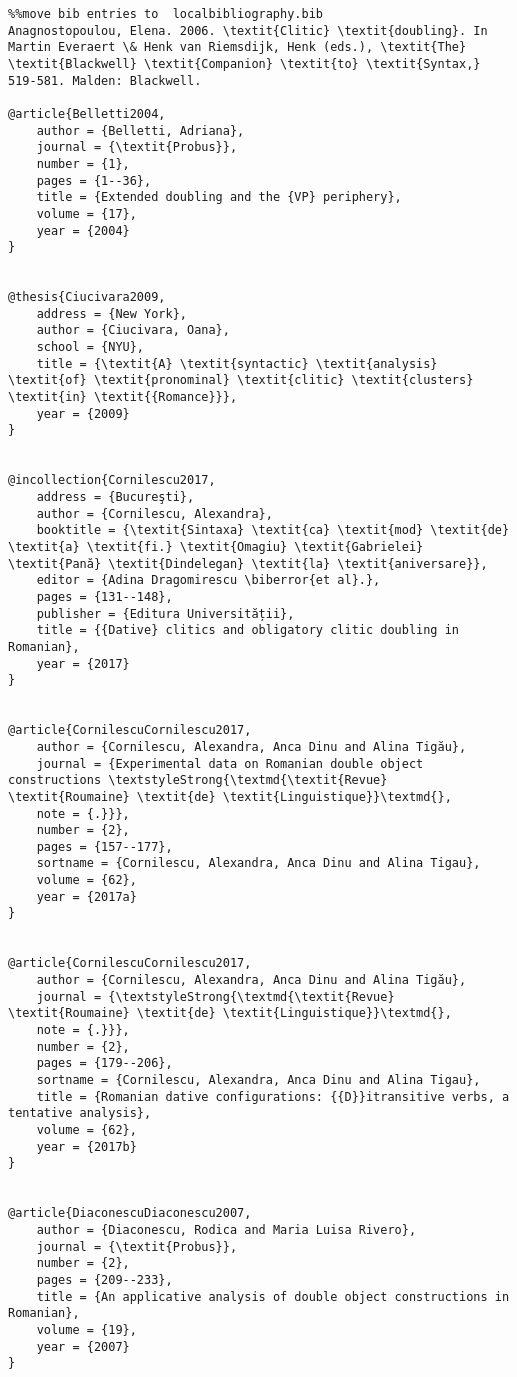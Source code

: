 \documentclass[output=paper,modfonts,nonflat]{langsci/langscibook}
\begin{document}
\begin{verbatim}%%move bib entries to  localbibliography.bib
Anagnostopoulou, Elena. 2006. \textit{Clitic} \textit{doubling}. In Martin Everaert \& Henk van Riemsdijk, Henk (eds.), \textit{The} \textit{Blackwell} \textit{Companion} \textit{to} \textit{Syntax,} 519-581. Malden: Blackwell.

@article{Belletti2004,
	author = {Belletti, Adriana},
	journal = {\textit{Probus}},
	number = {1},
	pages = {1--36},
	title = {Extended doubling and the {VP} periphery},
	volume = {17},
	year = {2004}
}


@thesis{Ciucivara2009,
	address = {New York},
	author = {Ciucivara, Oana},
	school = {NYU},
	title = {\textit{A} \textit{syntactic} \textit{analysis} \textit{of} \textit{pronominal} \textit{clitic} \textit{clusters} \textit{in} \textit{{Romance}}},
	year = {2009}
}


@incollection{Cornilescu2017,
	address = {Bucureşti},
	author = {Cornilescu, Alexandra},
	booktitle = {\textit{Sintaxa} \textit{ca} \textit{mod} \textit{de} \textit{a} \textit{fi.} \textit{Omagiu} \textit{Gabrielei} \textit{Pană} \textit{Dindelegan} \textit{la} \textit{aniversare}},
	editor = {Adina Dragomirescu \biberror{et al}.},
	pages = {131--148},
	publisher = {Editura Universității},
	title = {{Dative} clitics and obligatory clitic doubling in Romanian},
	year = {2017}
}


@article{CornilescuCornilescu2017,
	author = {Cornilescu, Alexandra, Anca Dinu and Alina Tigău},
	journal = {Experimental data on Romanian double object constructions \textstyleStrong{\textmd{\textit{Revue} \textit{Roumaine} \textit{de} \textit{Linguistique}}\textmd{},
	note = {.}}},
	number = {2},
	pages = {157--177},
	sortname = {Cornilescu, Alexandra, Anca Dinu and Alina Tigau},
	volume = {62},
	year = {2017a}
}


@article{CornilescuCornilescu2017,
	author = {Cornilescu, Alexandra, Anca Dinu and Alina Tigău},
	journal = {\textstyleStrong{\textmd{\textit{Revue} \textit{Roumaine} \textit{de} \textit{Linguistique}}\textmd{},
	note = {.}}},
	number = {2},
	pages = {179--206},
	sortname = {Cornilescu, Alexandra, Anca Dinu and Alina Tigau},
	title = {Romanian dative configurations: {{D}}itransitive verbs, a tentative analysis},
	volume = {62},
	year = {2017b}
}


@article{DiaconescuDiaconescu2007,
	author = {Diaconescu, Rodica and Maria Luisa Rivero},
	journal = {\textit{Probus}},
	number = {2},
	pages = {209--233},
	title = {An applicative analysis of double object constructions in Romanian},
	volume = {19},
	year = {2007}
}



\end{verbatim}
\end{document}
